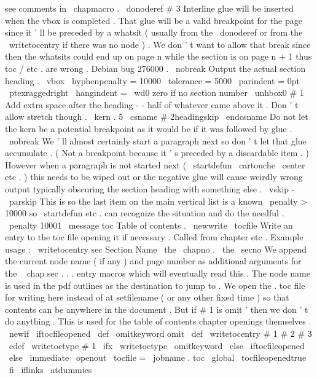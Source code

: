 {{{{{see
comments
in
\
chapmacro
.
\
donoderef
{
#
3
}
%
%
%
Interline
glue
will
be
inserted
when
the
vbox
is
completed
.
%
That
glue
will
be
a
valid
breakpoint
for
the
page
since
it
'
ll
be
%
preceded
by
a
whatsit
(
usually
from
the
\
donoderef
or
from
the
%
\
writetocentry
if
there
was
no
node
)
.
We
don
'
t
want
to
allow
that
%
break
since
then
the
whatsits
could
end
up
on
page
n
while
the
%
section
is
on
page
n
+
1
thus
toc
/
etc
.
are
wrong
.
Debian
bug
276000
.
\
nobreak
%
%
Output
the
actual
section
heading
.
\
vbox
{
\
hyphenpenalty
=
10000
\
tolerance
=
5000
\
parindent
=
0pt
\
ptexraggedright
\
hangindent
=
\
wd0
%
zero
if
no
section
number
\
unhbox0
#
1
}
%
}
%
%
Add
extra
space
after
the
heading
-
-
half
of
whatever
came
above
it
.
%
Don
'
t
allow
stretch
though
.
\
kern
.
5
\
csname
#
2headingskip
\
endcsname
%
%
Do
not
let
the
kern
be
a
potential
breakpoint
as
it
would
be
if
it
%
was
followed
by
glue
.
\
nobreak
%
%
We
'
ll
almost
certainly
start
a
paragraph
next
so
don
'
t
let
that
%
glue
accumulate
.
(
Not
a
breakpoint
because
it
'
s
preceded
by
a
%
discardable
item
.
)
However
when
a
paragraph
is
not
started
next
%
(
\
startdefun
\
cartouche
\
center
etc
.
)
this
needs
to
be
wiped
out
%
or
the
negative
glue
will
cause
weirdly
wrong
output
typically
%
obscuring
the
section
heading
with
something
else
.
\
vskip
-
\
parskip
%
%
This
is
so
the
last
item
on
the
main
vertical
list
is
a
known
%
\
penalty
>
10000
so
\
startdefun
etc
.
can
recognize
the
situation
%
and
do
the
needful
.
\
penalty
10001
}
\
message
{
toc
}
%
Table
of
contents
.
\
newwrite
\
tocfile
%
Write
an
entry
to
the
toc
file
opening
it
if
necessary
.
%
Called
from
chapter
etc
.
%
%
Example
usage
:
\
writetocentry
{
sec
}
{
Section
Name
}
{
\
the
\
chapno
.
\
the
\
secno
}
%
We
append
the
current
node
name
(
if
any
)
and
page
number
as
additional
%
arguments
for
the
\
{
chap
sec
.
.
.
}
entry
macros
which
will
eventually
%
read
this
.
The
node
name
is
used
in
the
pdf
outlines
as
the
%
destination
to
jump
to
.
%
%
We
open
the
.
toc
file
for
writing
here
instead
of
at
setfilename
(
or
%
any
other
fixed
time
)
so
that
contents
can
be
anywhere
in
the
document
.
%
But
if
#
1
is
omit
'
then
we
don
'
t
do
anything
.
This
is
used
for
the
%
table
of
contents
chapter
openings
themselves
.
%
\
newif
\
iftocfileopened
\
def
\
omitkeyword
{
omit
}
%
%
\
def
\
writetocentry
#
1
#
2
#
3
{
%
\
edef
\
writetoctype
{
#
1
}
%
\
ifx
\
writetoctype
\
omitkeyword
\
else
\
iftocfileopened
\
else
\
immediate
\
openout
\
tocfile
=
\
jobname
.
toc
\
global
\
tocfileopenedtrue
\
fi
%
\
iflinks
{
\
atdummies
}}}}}
